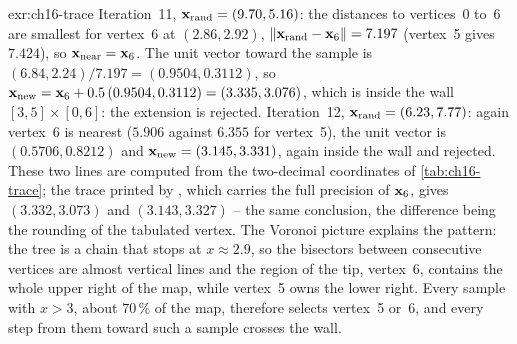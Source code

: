 \begin{solution}{exr:ch16-trace}
Iteration~11, $\mathbf{x}_{\mathrm{rand}}=(9.70,5.16)$: the distances to vertices~0
to~6 are smallest for vertex~6 at $(2.86,2.92)$, $\left\lVert \mathbf{x}_{\mathrm{rand}}-\mathbf{x}_6 \right\rVert=7.197$
(vertex~5 gives $7.424$), so $\mathbf{x}_{\mathrm{near}}=\mathbf{x}_6$. The unit vector
toward the sample is $(6.84,2.24)/7.197=(0.9504,0.3112)$, so
$\mathbf{x}_{\mathrm{new}}=\mathbf{x}_6+0.5\,(0.9504,0.3112)=(3.335,3.076)$, which is inside
the wall $[3,5]\times[0,6]$: the extension is rejected. Iteration~12,
$\mathbf{x}_{\mathrm{rand}}=(6.23,7.77)$: again vertex~6 is nearest ($5.906$ against
$6.355$ for vertex~5), the unit vector is $(0.5706,0.8212)$ and
$\mathbf{x}_{\mathrm{new}}=(3.145,3.331)$, again inside the wall and rejected. These
two lines are computed from the two-decimal coordinates of
\cref{tab:ch16-trace}; the trace printed by , which carries
the full precision of $\mathbf{x}_6$, gives $(3.332,3.073)$ and $(3.143,3.327)$ -- the
same conclusion, the difference being the rounding of the tabulated vertex. The Voronoi picture
explains the pattern: the tree is a chain that stops at $x\approx2.9$, so
the bisectors between consecutive vertices are almost vertical lines and the
region of the tip, vertex~6, contains the whole upper right of the map,
while vertex~5 owns the lower right. Every sample with $x>3$, about $70\,\%$
of the map, therefore selects vertex~5 or~6, and every step from them
toward such a sample crosses the wall.
\end{solution}

